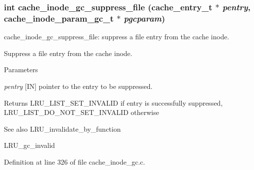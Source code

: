 \subsubsection[{cache\_\-inode\_\-gc\_\-suppress\_\-file}]{\setlength{\rightskip}{0pt plus 5cm}int cache\_\-inode\_\-gc\_\-suppress\_\-file (cache\_\-entry\_\-t $\ast$ {\em pentry}, \/  cache\_\-inode\_\-param\_\-gc\_\-t $\ast$ {\em pgcparam})}\label{group__Cache__inode__gc__internal_ga135dcc8a575d9f808b57ae2a74e615b3}
cache\_\-inode\_\-gc\_\-suppress\_\-file: suppress a file entry from the cache inode.

Suppress a file entry from the cache inode.


\begin{DoxyParams}{Parameters}
\item[{\em pentry}][IN] pointer to the entry to be suppressed.\end{DoxyParams}
\begin{DoxyReturn}{Returns}
LRU\_\-LIST\_\-SET\_\-INVALID if entry is successfully suppressed, LRU\_\-LIST\_\-DO\_\-NOT\_\-SET\_\-INVALID otherwise
\end{DoxyReturn}
\begin{DoxySeeAlso}{See also}
LRU\_\-invalidate\_\-by\_\-function 

LRU\_\-gc\_\-invalid 
\end{DoxySeeAlso}


Definition at line 326 of file cache\_\-inode\_\-gc.c.